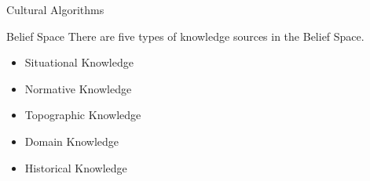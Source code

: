 \documentclass[table]{beamer}
\begin{document}
	\begin{frame}{Cultural Algorithms}
		\justifying
		\begin{block}{Belief Space}
			There are five types of \alert{knowledge sources} in the Belief Space. 
			\cite{reynolds2010weaving}
		\end{block}
		\begin{block}{}
			\begin{itemize}
				\item Situational Knowledge
				\item Normative Knowledge
				\item Topographic Knowledge
				\item Domain Knowledge
				\item Historical Knowledge
			\end{itemize}
		\end{block}
	\end{frame}
	
	
	
\end{document}
